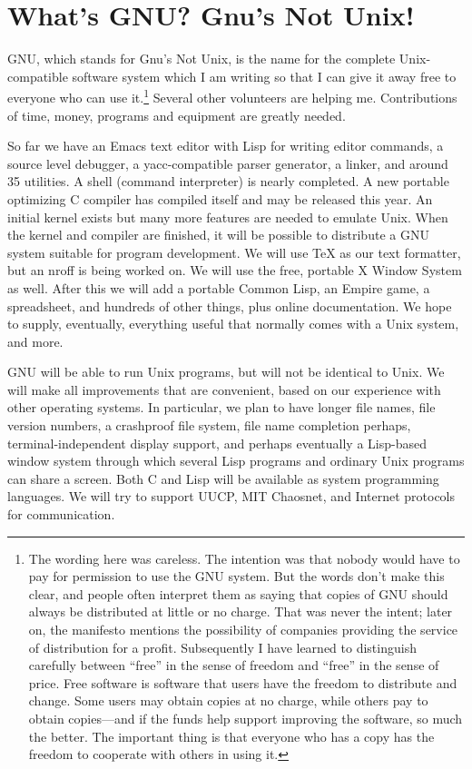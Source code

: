 \section{What's GNU? Gnu's Not Unix!}
GNU, which stands for Gnu's Not Unix, is the name for the complete Unix-compatible software system which I am writing so that I can give it away free to everyone who can use it.\footnote{The wording here was careless. The intention was that nobody would have to pay for permission to use the GNU system. But the words don't make this clear, and people often interpret them as saying that copies of GNU should always be distributed at little or no charge. That was never the intent; later on, the manifesto mentions the possibility of companies providing the service of distribution for a profit. Subsequently I have learned to distinguish carefully between “free” in the sense of freedom and “free” in the sense of price. Free software is software that users have the freedom to distribute and change. Some users may obtain copies at no charge, while others pay to obtain copies—and if the funds help support improving the software, so much the better. The important thing is that everyone who has a copy has the freedom to cooperate with others in using it.}  Several other volunteers are helping me. Contributions of time, money, programs and equipment are greatly needed.\par
So far we have an Emacs text editor with Lisp for writing editor commands, a source level debugger, a yacc-compatible parser generator, a linker, and around 35 utilities. A shell (command interpreter) is nearly completed. A new portable optimizing C compiler has compiled itself and may be released this year. An initial kernel exists but many more features are needed to emulate Unix. When the kernel and compiler are finished, it will be possible to distribute a GNU system suitable for program development. We will use TeX as our text formatter, but an nroff is being worked on. We will use the free, portable X Window System as well. After this we will add a portable Common Lisp, an Empire game, a spreadsheet, and hundreds of other things, plus online documentation. We hope to supply, eventually, everything useful that normally comes with a Unix system, and more.\par
GNU will be able to run Unix programs, but will not be identical to Unix. We will make all improvements that are convenient, based on our experience with other operating systems. In particular, we plan to have longer file names, file version numbers, a crashproof file system, file name completion perhaps, terminal-independent display support, and perhaps eventually a Lisp-based window system through which several Lisp programs and ordinary Unix programs can share a screen. Both C and Lisp will be available as system programming languages. We will try to support UUCP, MIT Chaosnet, and Internet protocols for communication.\par
